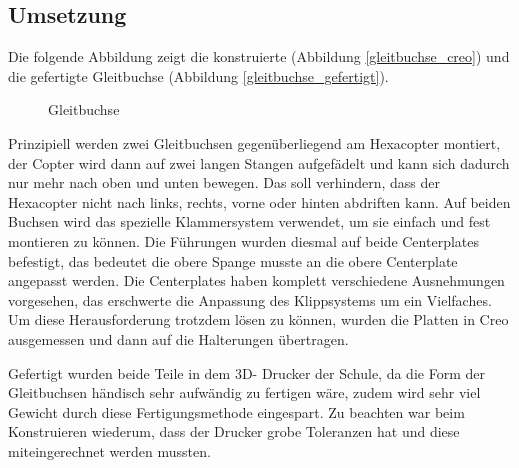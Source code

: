 	\subsection{Umsetzung}

	Die folgende Abbildung zeigt die konstruierte (Abbildung \ref{gleitbuchse_creo}) und die gefertigte Gleitbuchse (Abbildung \ref{gleitbuchse_gefertigt}).

			\begin{figure}[tbh]
				\begin{centering}
				\par\end{centering}
				\caption{Gleitbuchse}
				\label{Gleitbuchse}
			\end{figure}

	Prinzipiell werden zwei Gleitbuchsen gegenüberliegend am Hexacopter montiert, der Copter wird dann auf zwei langen Stangen aufgefädelt und kann sich dadurch nur mehr nach oben und unten bewegen.
	Das soll verhindern, dass der Hexacopter nicht nach links, rechts, vorne oder hinten abdriften kann.
	Auf beiden Buchsen wird das spezielle Klammersystem verwendet, um sie einfach und fest montieren zu können.
	Die Führungen wurden diesmal auf beide Centerplates befestigt, das bedeutet die obere Spange musste an die obere Centerplate angepasst werden.
	Die Centerplates haben komplett verschiedene Ausnehmungen vorgesehen, das erschwerte die Anpassung des Klippsystems um ein Vielfaches.
	Um diese Herausforderung trotzdem lösen zu können, wurden die Platten in Creo ausgemessen und dann auf die Halterungen übertragen.

			\newpage

	Gefertigt wurden beide Teile in dem 3D- Drucker der Schule, da die Form der Gleitbuchsen händisch sehr aufwändig zu fertigen wäre, zudem wird sehr viel Gewicht durch diese Fertigungsmethode eingespart.
	Zu beachten war beim Konstruieren wiederum, dass der Drucker grobe Toleranzen hat und diese miteingerechnet werden mussten.

